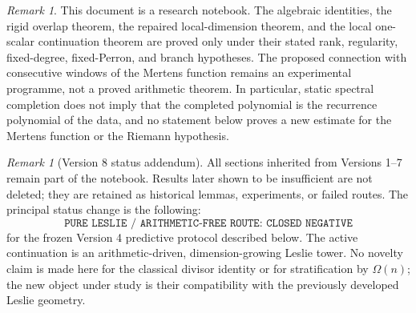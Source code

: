 \documentclass[11pt]{amsart}
\numberwithin{equation}{section}
\theoremstyle{plain}
\theoremstyle{definition}
\theoremstyle{remark}
\newtheorem{remark}[theorem]{Remark}
\begin{document}
\begin{abstract}
The continuation therefore injects arithmetic before asking Leslie geometry to compress it.
The arithmetic source is the finite divisibility poset.  Its incidence matrix
$D_X=(\mathbf 1_{d\mid n})_{n,d\le X}$ is parameter-free and satisfies
$D_X\mu_X=e_1$ and $(D_X^{-1})_{n,d}=\mu(n/d)$ when $d\mid n$.  A filtration by
$\Omega(n)$ yields exact block extensions
\[
D_{k+1}=
\begin{pmatrix}D_k&0\\ B_k&I\end{pmatrix},
\qquad
\mu_{k+1}=
\begin{pmatrix}\mu_k\\-B_k\mu_k\end{pmatrix},
\]
so every old value is preserved and all new arithmetic information enters through the new
incidence block $B_k$.  The active problem is no longer to make a fixed Leslie family discover
M\"obius without arithmetic, but to determine whether a coherent tower of positive Leslie
companions can represent these exact divisor-layer extensions without refitting old levels.

\end{abstract}
\maketitle

\tableofcontents
\bigskip

\begin{remark}
\label{rem:status}
This document is a research notebook.  The algebraic identities, the rigid overlap theorem,
the repaired local-dimension theorem, and the local one-scalar continuation theorem are proved
only under their stated rank, regularity, fixed-degree, fixed-Perron, and branch hypotheses.
The proposed connection with consecutive windows of the Mertens function remains an experimental
programme, not a proved arithmetic theorem.  In particular, static spectral completion does not
imply that the completed polynomial is the recurrence polynomial of the data, and no statement
below proves a new estimate for the Mertens function or the Riemann hypothesis.
\end{remark}

\begin{remark}[Version 8 status addendum]
\label{rem:v8_status_addendum}
All sections inherited from Versions 1--7 remain part of the notebook.  Results later shown to be
insufficient are not deleted; they are retained as historical lemmas, experiments, or failed
routes.  The principal status change is the following:
\[
\boxed{\texttt{PURE LESLIE / ARITHMETIC-FREE ROUTE: CLOSED NEGATIVE}}
\]
for the frozen Version 4 predictive protocol described below.  The active continuation is an
arithmetic-driven, dimension-growing Leslie tower.  No novelty claim is made here for the
classical divisor identity or for stratification by $\Omega(n)$; the new object under study is
their compatibility with the previously developed Leslie geometry.
\end{remark}
\end{document}
